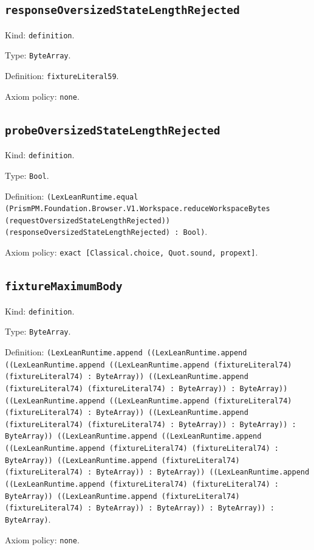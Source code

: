 \documentclass[11pt]{article}
\begin{document}
\subsection*{\texttt{responseOversizedStateLengthRejected}}
\noindent Kind: \texttt{definition}.\par
\noindent Type: \texttt{ByteArray}.\par
\noindent Definition: \texttt{fixtureLiteral59}.\par
\noindent Axiom policy: \texttt{none}.\par
\subsection*{\texttt{probeOversizedStateLengthRejected}}
\noindent Kind: \texttt{definition}.\par
\noindent Type: \texttt{Bool}.\par
\noindent Definition: \texttt{(LexLeanRuntime.equal (PrismPM.Foundation.Browser.V1.Workspace.reduceWorkspaceBytes (requestOversizedStateLengthRejected)) (responseOversizedStateLengthRejected) : Bool)}.\par
\noindent Axiom policy: \texttt{exact [Classical.choice, Quot.sound, propext]}.\par
\subsection*{\texttt{fixtureMaximumBody}}
\noindent Kind: \texttt{definition}.\par
\noindent Type: \texttt{ByteArray}.\par
\noindent Definition: \texttt{(LexLeanRuntime.append ((LexLeanRuntime.append ((LexLeanRuntime.append ((LexLeanRuntime.append (fixtureLiteral74) (fixtureLiteral74) : ByteArray)) ((LexLeanRuntime.append (fixtureLiteral74) (fixtureLiteral74) : ByteArray)) : ByteArray)) ((LexLeanRuntime.append ((LexLeanRuntime.append (fixtureLiteral74) (fixtureLiteral74) : ByteArray)) ((LexLeanRuntime.append (fixtureLiteral74) (fixtureLiteral74) : ByteArray)) : ByteArray)) : ByteArray)) ((LexLeanRuntime.append ((LexLeanRuntime.append ((LexLeanRuntime.append (fixtureLiteral74) (fixtureLiteral74) : ByteArray)) ((LexLeanRuntime.append (fixtureLiteral74) (fixtureLiteral74) : ByteArray)) : ByteArray)) ((LexLeanRuntime.append ((LexLeanRuntime.append (fixtureLiteral74) (fixtureLiteral74) : ByteArray)) ((LexLeanRuntime.append (fixtureLiteral74) (fixtureLiteral74) : ByteArray)) : ByteArray)) : ByteArray)) : ByteArray)}.\par
\noindent Axiom policy: \texttt{none}.\par
\end{document}
